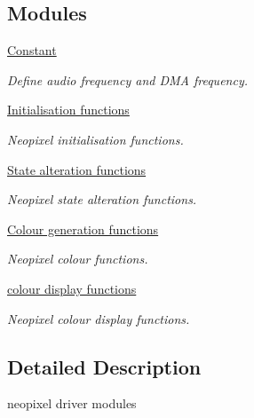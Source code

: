 \subsection*{Modules}
\begin{DoxyCompactItemize}
\item 
\hyperlink{group___constant}{Constant}
\begin{DoxyCompactList}\small\item\em Define audio frequency and D\+MA frequency. \end{DoxyCompactList}\item 
\hyperlink{group___neo_pixel___init}{Initialisation functions}
\begin{DoxyCompactList}\small\item\em Neopixel initialisation functions. \end{DoxyCompactList}\item 
\hyperlink{group___neo_pixel___state}{State alteration functions}
\begin{DoxyCompactList}\small\item\em Neopixel state alteration functions. \end{DoxyCompactList}\item 
\hyperlink{group___neo_pixel___colour}{Colour generation functions}
\begin{DoxyCompactList}\small\item\em Neopixel colour functions. \end{DoxyCompactList}\item 
\hyperlink{group___neo_pixel___display}{colour display functions}
\begin{DoxyCompactList}\small\item\em Neopixel colour display functions. \end{DoxyCompactList}\end{DoxyCompactItemize}


\subsection{Detailed Description}
neopixel driver modules 

